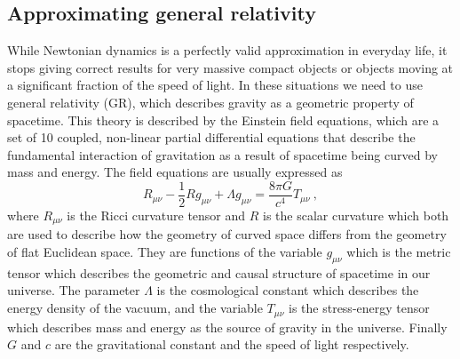 \documentclass[english, oneside]{HYgradu}
\begin{document}
\subsection{Approximating general relativity}

While Newtonian dynamics is a perfectly valid approximation in everyday life, it stops giving correct results for very massive compact objects or objects moving at a significant fraction of the speed of light. In these situations we need to use general relativity (GR), which describes gravity as a geometric property of spacetime. This theory is described by the Einstein field equations, which are a set of 10 coupled, non-linear partial differential equations that describe the fundamental interaction of gravitation as a result of spacetime being curved by mass and energy. The field equations are usually expressed as
\begin{equation}
R_{\mu \nu} - \frac{1}{2}R g_{\mu \nu} + \Lambda g_{\mu \nu} = \frac{8 \pi G}{c^4} T_{\mu \nu} \ ,
\end{equation}
where $R_{\mu \nu}$ is the Ricci curvature tensor and $R$ is the scalar curvature which both are used to describe how the geometry of curved space differs from the geometry of flat Euclidean space. They are functions of the variable $g_{\mu \nu}$ which is the metric tensor which describes the geometric and causal structure of spacetime in our universe. The parameter $\Lambda$ is the cosmological constant which describes the energy density of the vacuum, and the variable $T_{\mu \nu}$ is the stress-energy tensor which describes mass and energy as the source of gravity in the universe. Finally $G$ and $c$ are the gravitational constant and the speed of light respectively.
\end{document}
